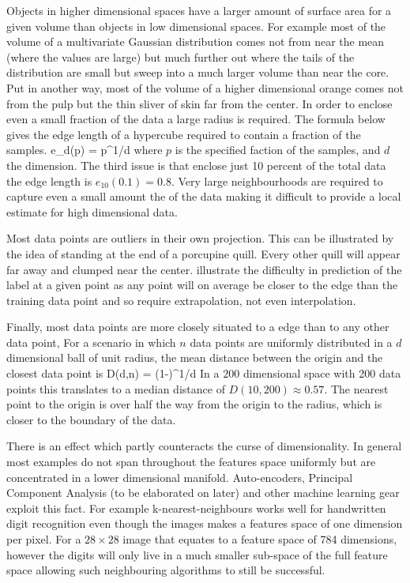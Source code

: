 Objects in higher dimensional spaces have a larger amount of surface area for a given volume than objects in low dimensional spaces.
For example most of the volume of a multivariate Gaussian distribution comes not from near the mean (where the values are large) but much further out where the tails of the distribution are small but sweep into a much larger volume than near the core.
Put in another way, most of the volume of a higher dimensional orange comes not from the pulp but the thin sliver of skin far from the center.
In order to enclose even a small fraction of the data a large radius is required.
The formula below gives the edge length of a hypercube required to contain a fraction of the samples.
\be
e_d(p) = p^{1/d}
\ee
where $p$ is the specified faction of the samples, and $d$ the dimension.
The third issue is that enclose just 10 percent of the total data the edge length is $e_{10}(0.1)=0.8$.
Very large neighbourhoods are required to capture even a small amount the of the data making it difficult to provide a local estimate for high dimensional data.

Most data points are outliers in their own projection.
This can be illustrated by the idea of standing at the end of a porcupine quill.
Every other quill will appear far away and clumped near the center.
illustrate the difficulty in prediction of the label at a given point as any point will on average be closer to the edge than the training data point and so require extrapolation, not even interpolation.

Finally, most data points are more closely situated to a edge than to any other data point,
For a scenario in which $n$ data points are uniformly distributed in a $d$ dimensional ball of unit radius, the mean distance between the origin and the closest data point is 
\be
D(d,n) = \left(1-\right)^{1/d}
\ee
In a $200$ dimensional space with 200 data points this translates to a median distance of $D(10,200)\approx0.57$.
The nearest point to the origin is over half the way from the origin to the radius, which is closer to the boundary of the data.

There is an effect which partly counteracts the curse of dimensionality.
In general most examples do not span throughout the features space uniformly but are concentrated in a lower dimensional manifold.
Auto-encoders, Principal Component Analysis (to be elaborated on later) and other machine learning gear exploit this fact.
For example k-nearest-neighbours works well for handwritten digit recognition even though the images makes a features space of one dimension per pixel. 
For a $28\times28$ image that equates to a feature space of 784 dimensions, however the digits will only live in a much smaller sub-space of the full feature space allowing such neighbouring algorithms to still be successful.

